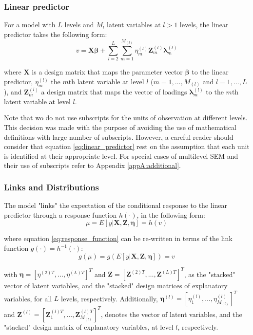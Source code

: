 \subsubsection{Linear predictor}
For a model with $L$ levels and $M_{l}$ latent variables at $l>1$ levels, the linear predictor takes the following form:
\begin{equation} \label{eq:linear_predictor}
	v = \mathbf{X} \pmb{\beta} + \sum_{l=2}^{L} \sum_{m=1}^{M_{(l)}} \eta_{m}^{(l)} \mathbf{Z}_{m}^{(l)} \pmb{\lambda}_{m}^{(l)}
\end{equation}

\noindent where $\mathbf{X}$ is a design matrix that maps the parameter vector $\pmb{\beta}$ to the linear predictor, $\eta_{m}^{(l)}$ the $m$th latent variable at level $l$ ($m=1, \dots, M_{(l)}$ and $l=1, \dots, L$), and $\mathbf{Z}_{m}^{(l)}$ a design matrix that maps the vector of loadings $\pmb{\lambda}_{m}^{(l)}$ to the $m$th latent variable at level $l$.

Note that wo do not use subscripts for the units of observation at different levels. This decision was made with the purpose of avoiding the use of mathematical definitions with large number of subscripts. However, a careful reader should consider that equation \ref{eq:linear_predictor} rest on the assumption that each unit is identified at their appropriate level. For special cases of multilevel SEM and their use of subscripts refer to Appendix \ref{appA:additional}.

\subsubsection{Links and Distributions}
The model "links" the expectation of the conditional response to the linear predictor through a response function $h(\cdot)$, in the following form: 
\begin{equation} \label{eq:response_function}
	\mu = E[y | \mathbf{X}, \mathbf{Z}, \pmb{\eta}] = h(v)
\end{equation}

\noindent where equation \ref{eq:response_function} can be re-written in terms of the link function $g(\cdot) = h^{-1}(\cdot)$:
\begin{equation} \label{eq:link_function}
	g(\mu) = g(E[y | \mathbf{X}, \mathbf{Z}, \pmb{\eta}]) = v
\end{equation}

\noindent with $\pmb{\eta}=\left[\eta^{(2)T}, \dots, \eta^{(L)T}\right]^{T}$ and $\mathbf{Z}=\left[\mathbf{Z}^{(2)T}, \dots, \mathbf{Z}^{(L)T}\right]^{T}$, as the "stacked" vector of latent variables, and the "stacked" design matrices of explanatory variables, for all $L$ levels, respectively. Additionally, $\pmb{\eta}^{(l)}=\left[\eta_{1}^{(l)}, \dots, \eta_{M_{(l)}}^{(l)}\right]^{T}$ and $\mathbf{Z}^{(l)}=\left[\mathbf{Z}_{1}^{(l)T}, \dots, \mathbf{Z}_{M_{(l)}}^{(l)T}\right]^{T}$, denotes the vector of latent variables, and the "stacked" design matrix of explanatory variables, at level $l$, respectively.

